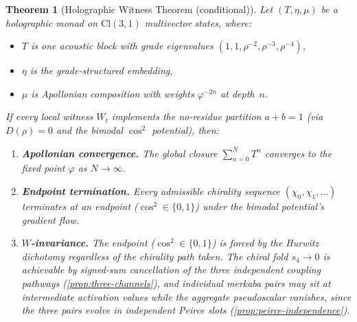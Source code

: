 \documentclass[11pt,a4paper]{article}
\theoremstyle{plain}
\newtheorem{theorem}{Theorem}[section]
\theoremstyle{definition}
\theoremstyle{remark}
\numberwithin{equation}{section}
\providecommand{\Cl}{\mathrm{Cl}}
\providecommand{\vp}{\varphi}
\begin{document}
\begin{keyresultbox}
\begin{theorem}[Holographic Witness Theorem (conditional)]
\label{thm:holographic-witness}
Let $(T, \eta, \mu)$ be a holographic monad on $\Cl(3,1)$
multivector states, where:
\begin{itemize}[nosep]
  \item $T$ is one acoustic block with grade eigenvalues
    $(1, 1, \rho^{-2}, \rho^{-3}, \rho^{-4})$,
  \item $\eta$ is the grade-structured embedding,
  \item $\mu$ is Apollonian composition with weights
    $\vp^{-2n}$ at depth~$n$.
\end{itemize}
If every local witness $W_t$ implements the no-residue
partition $a + b = 1$ (via $D(\rho) = 0$ and the bimodal
$\cos^2$ potential), then:
\begin{enumerate}[label=(\arabic*)]
  \item \textbf{Apollonian convergence.}
    The global closure $\sum_{n=0}^N T^n$ converges to the
    fixed point $\vp$ as $N \to \infty$.
  \item \textbf{Endpoint termination.}
    Every admissible chirality sequence
    $(\chi_0, \chi_1, \ldots)$ terminates at an endpoint
    ($\cos^2 \in \{0, 1\}$) under the bimodal potential's
    gradient flow.
  \item \textbf{$W$-invariance.}
    The endpoint ($\cos^2 \in \{0, 1\}$) is forced by the Hurwitz
    dichotomy regardless of the chirality path taken.  The
    chiral fold $s_4 \to 0$ is achievable by signed-sum
    cancellation of the three independent coupling pathways
    (\cref{prop:three-channels}), and individual merkaba pairs
    may sit at intermediate activation values while the aggregate
    pseudoscalar vanishes, since the three pairs evolve in
    independent Peirce slots (\cref{prop:peirce-independence}).
\end{enumerate}
\end{theorem}
\end{keyresultbox}
\end{document}
